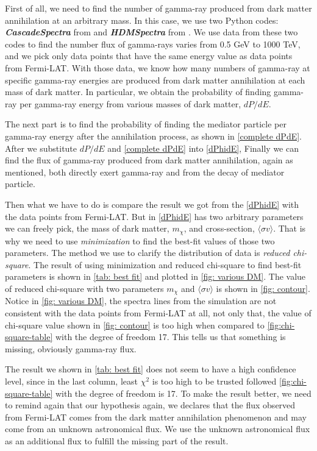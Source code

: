 \documentclass[10pt, oneside]{book}
\numberwithin{equation}{chapter}
\begin{document}
First of all, we need to find the number of gamma-ray produced from dark matter annihilation at an arbitrary mass. In this case, we use two Python codes: \textbf{\textit{CascadeSpectra}} from \cite{Marco_Cirelli_2011} and \textit{\textbf{HDMSpectra}} from \cite{Bauer_2021}. We use data from these two codes to find the number flux of gamma-rays varies from 0.5 GeV to 1000 TeV, and we pick only data points that have the same energy value as data points from Fermi-LAT. With those data, we know how many numbers of gamma-ray at specific gamma-ray energies are produced from dark matter annihilation at each mass of dark matter. In particular, we obtain the probability of finding gamma-ray per gamma-ray energy from various masses of dark matter, $dP/dE$.

The next part is to find the probability of finding the mediator particle per gamma-ray energy after the annihilation process, as shown in \autoref{complete dPdE}. After we substitute $dP/dE$ and \autoref{complete dPdE} into \autoref{dPhidE}, Finally we can find the flux of gamma-ray produced from dark matter annihilation, again as mentioned, both directly exert gamma-ray and from the decay of mediator particle.

Then what we have to do is compare the result we got from the \autoref{dPhidE} with the data points from Fermi-LAT. But in \autoref{dPhidE} has two arbitrary parameters we can freely pick, the mass of dark matter, $m_\chi$, and cross-section, $\langle \sigma v \rangle$. That is why we need to use \textit{minimization} to find the best-fit values of those two parameters. The method we use to clarify the distribution of data is \textit{reduced chi-square}. The result of using minimization and reduced chi-square to find best-fit parameters is shown in \autoref{tab: best fit} and plotted in \autoref{fig: various DM}. The value of reduced chi-square with two parameters $m_\chi$ and $\langle \sigma v \rangle$ is shown in \autoref{fig: contour}. Notice in \autoref{fig: various DM}, the spectra lines from the simulation are not consistent with the data points from Fermi-LAT at all, not only that, the value of chi-square value shown in \autoref{fig: contour} is too high when compared to \autoref{fig:chi-square-table} with the degree of freedom 17. This tells us that something is missing, obviously gamma-ray flux.

The result we shown in \autoref{tab: best fit} does not seem to have a high confidence level, since in the last column, least $\chi^2$ is too high to be trusted followed \autoref{fig:chi-square-table} with the degree of freedom is 17. To make the result better, we need to remind again that our hypothesis again, we declares that the flux observed from Fermi-LAT comes from the dark matter annihilation phenomenon and may come from an unknown astronomical flux. We use the unknown astronomical flux as an additional flux to fulfill the missing part of the result.
\end{document}
